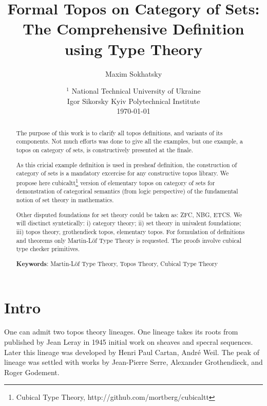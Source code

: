 \documentclass{article}
\theoremstyle{definition}
\begin{document}
\title{Formal Topos on Category of Sets: \\
      The Comprehensive Definition \\
      using Type Theory}
\author{Maxim Sokhatsky}
\date{
    $^1$ National Technical University of Ukraine \\
    \small Igor Sikorsky Kyiv Polytechnical Institute\\
    \today
}

\maketitle

\begin{abstract}

The purpose of this work is to clarify all topos definitions, and variants of its components.
Not much efforts was done to give all the examples, but one example, a topos
on category of sets, is constructively presented at the finale.

As this cricial example definition is used in presheaf definition,
the construction of category of sets is a mandatory excercise for any constructive topos library.
We propose here cubicaltt\footnote{Cubical Type Theory, http://github.com/mortberg/cubicaltt} version of elementary topos on category of sets for demonstration of categorical
semantics (from logic perspective) of the fundamental notion of set theory in mathematics.

Other disputed foundations for set theory could be taken as:
ZFC, NBG, ETCS. We will disctinct syntetically: i) category theory;
ii) set theory in univalent foundations; iii) topos theory, grothendieck topos,
elementary topos. For formulation of definitions and theorems only Martin-Löf
Type Theory is requested. The proofs involve cubical type checker primitives.

{\bf Keywords}: Martin-Löf Type Theory, Topos Theory, Cubical Type Theory
\end{abstract}
\tableofcontents
\newpage

\section*{Intro}

One can admit two topos theory lineages. One lineage takes its roots from published
by Jean Leray in 1945 initial work on sheaves and specral sequences. Later this lineage
was developed by Henri Paul Cartan, André Weil. The peak of lineage was settled
with works by Jean-Pierre Serre, Alexander Grothendieck, and Roger Godement.
\end{document}
